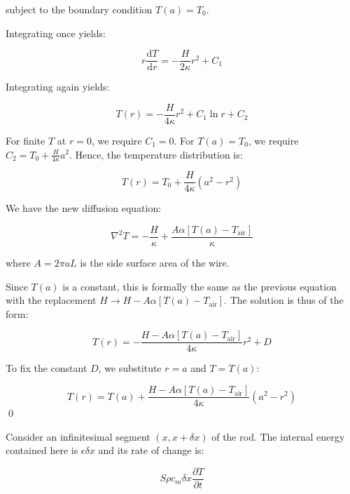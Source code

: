 \documentclass[12pt]{article}
\begin{document}
subject to the boundary condition $T(a) = T_{0}$.

Integrating once yields:

\begin{equation}
    r \frac{\mathrm{d}T}{\mathrm{d}r} = -\frac{H}{2\kappa} r^{2} + C_{1}
\end{equation}

Integrating again yields:

\begin{equation}
    T(r) = -\frac{H}{4\kappa} r^{2} + C_{1} \ln{r} + C_{2}
\end{equation}

For finite $T$ at $r = 0$, we require $C_{1} = 0$. For $T(a) = T_{0}$, we require $C_{2} = T_{0} + \frac{H}{4\kappa} a^{2}$. Hence, the temperature distribution is:

\begin{equation}
    T(r) = T_{0} + \frac{H}{4\kappa} \left( a^{2} - r^{2} \right)
\end{equation}


We have the new diffusion equation:

\begin{equation}
    \nabla^{2} T = -\frac{H}{\kappa} + \frac{A\alpha[T(a) - T_{\text{air}}]}{\kappa} 
\end{equation}

where $A = 2\pi a L$ is the side surface area of the wire.

Since $T(a)$ is a constant, this is formally the same as the previous equation with the replacement $H \rightarrow H - A\alpha[T(a) - T_{\text{air}}]$. The solution is thus of the form:

\begin{equation}
    T(r) = -\frac{H - A\alpha[T(a) - T_{\text{air}}]}{4\kappa} r^{2} + D
\end{equation}

To fix the constant $D$, we substitute $r = a$ and $T = T(a)$:

\begin{equation}
    T(r) = T(a) + \frac{H - A\alpha[T(a) - T_{\text{air}}]}{4\kappa} \left( a^{2} - r^{2} \right)
\end{equation}
\qed


Consider an infinitesimal segment $(x, x + \delta x)$ of the rod. The internal energy contained here is $\epsilon \delta x$ and its rate of change is:

\begin{equation}
    S\rho c_{m} \delta x \frac{\partial T}{\partial t}
\end{equation}
\end{document}
